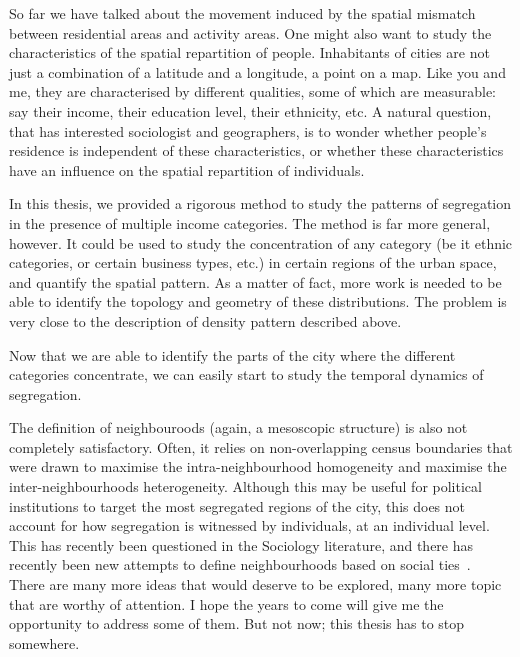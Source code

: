 So far we have talked about the movement induced by the spatial mismatch between
residential areas and activity areas. One might also want to study the
characteristics of the spatial repartition of people. Inhabitants of cities are
not just a combination of a latitude and a longitude, a point on a map. Like you
and me, they are characterised by different qualities, some of which are
measurable: say their income, their education level, their ethnicity, etc. A
natural question, that has interested sociologist and geographers, is to wonder
whether people's residence is independent of these characteristics, or whether
these characteristics have an influence on the spatial repartition of
individuals.  

In this thesis, we provided a rigorous method to study the patterns of
segregation in the presence of multiple income categories. The method is far
more general, however. It could be used to study the concentration of any
category (be it ethnic categories, or certain business types, etc.)
in certain regions of the urban space, and quantify the spatial pattern. As a
matter of fact, more work is needed to be able to identify the topology and
geometry of these distributions. The problem is very close to the description of
density pattern described above.

Now that we are able to identify the parts of the city where the different
categories concentrate, we can easily start to study the temporal dynamics of
segregation. 

The definition of neighbouroods (again, a mesoscopic structure) is also not
completely satisfactory. Often, it relies on non-overlapping census boundaries
that were drawn to maximise the intra-neighbourhood homogeneity and maximise the
inter-neighbourhoods heterogeneity. Although this may be useful for political
institutions to target the most segregated regions of the city, this does not
account for how segregation is witnessed by individuals, at an individual level.
This has recently been questioned in the Sociology literature, and there has
recently been new attempts to define neighbourhoods based on social ties~\cite{Hipp:2012}.\\

There are many more ideas that would deserve to be explored, many more topic
that are worthy of attention. I hope the years to come will give me the opportunity
to address some of them. But not now; this thesis has to stop somewhere.  
